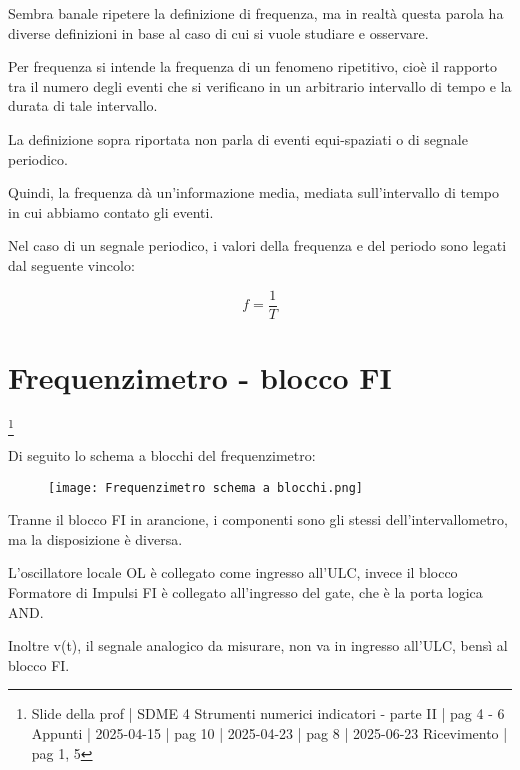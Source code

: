 Sembra banale ripetere la definizione di frequenza, ma in realtà questa parola ha diverse definizioni in base al caso 
di cui si vuole studiare e osservare. \newline 

Per frequenza si intende la frequenza di un fenomeno ripetitivo, 
cioè il rapporto tra il numero degli eventi che si verificano in un arbitrario intervallo di tempo e la durata di tale intervallo. \newline 

La definizione sopra riportata non parla di eventi equi-spaziati o di segnale periodico. \newline 

Quindi, la frequenza dà un'informazione media, mediata sull'intervallo di tempo in cui abbiamo contato gli eventi. \newline 

Nel caso di un segnale periodico, 
i valori della frequenza e del periodo sono legati dal seguente vincolo: 

{
    \Large 
    \begin{equation}
        f = \frac{1}{T}
    \end{equation}
}

\newpage 

\section{Frequenzimetro - blocco FI}
\footnote{Slide della prof | SDME 4 Strumenti numerici indicatori - parte II | pag 4 - 6 \\  
Appunti | 2025-04-15 | pag 10 | 2025-04-23 | pag 8 | 2025-06-23 Ricevimento | pag 1, 5}

Di seguito lo schema a blocchi del frequenzimetro: 

\begin{figure}[h]
    \centering
    \texttt{[image: Frequenzimetro schema a blocchi.png]}
\end{figure}

Tranne il blocco FI in arancione, 
i componenti sono gli stessi dell'intervallometro, 
ma la disposizione è diversa. \newline 

L'oscillatore locale OL è collegato come ingresso all'ULC, 
invece il blocco Formatore di Impulsi FI è collegato all'ingresso del gate, 
che è la porta logica AND. \newline 

Inoltre v(t), il segnale analogico da misurare, non va in ingresso all'ULC, 
bensì al blocco FI. \newline 

